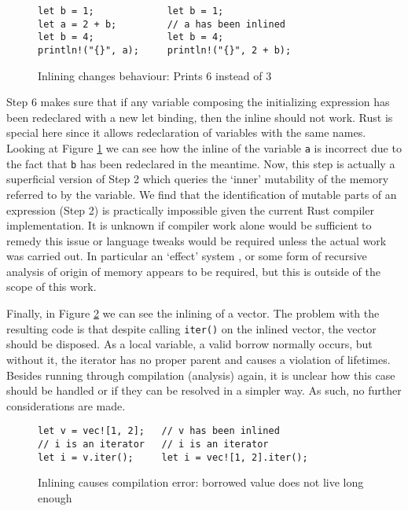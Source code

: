 \begin{figure}[h]
\begin{verbatim}
let b = 1;             let b = 1;
let a = 2 + b;         // a has been inlined
let b = 4;             let b = 4;
println!("{}", a);     println!("{}", 2 + b);
\end{verbatim}
\caption{Inlining changes behaviour: Prints 6 instead of 3}
\label{Fig:newlet}
\end{figure}

Step 6 makes sure that if any variable composing the initializing expression has been redeclared with a new let binding, then the inline should not work. Rust is special here since it allows redeclaration of variables with the same names. Looking at Figure \ref{Fig:newlet} we can see how the inline of the variable {\verb|a|} is incorrect due to the fact that {\verb|b|} has been redeclared in the meantime. Now, this step is actually a superficial version of Step 2 which queries the `inner' mutability of the memory referred to by the variable. We find that the identification of mutable parts of an expression (Step 2) is practically impossible given the current Rust compiler implementation. It is unknown if compiler work alone would be sufficient to remedy this issue or language tweaks would be required unless the actual work was carried out. In particular an `effect' system \cite{effects}, or some form of recursive analysis of origin of memory appears to be required, but this is outside of the scope of this work.

Finally, in Figure \ref{Fig:inlinefail} we can see the inlining of a vector. The problem with the resulting code is that despite calling {\verb|iter()|} on the inlined vector, the vector should be disposed. As a local variable, a valid borrow normally occurs, but without it, the iterator has no proper parent and causes a violation of lifetimes. Besides running through compilation (analysis) again, it is unclear how this case should be handled or if they can be resolved in a simpler way. As such, no further considerations are made.

\begin{figure}[h]
\begin{verbatim}
let v = vec![1, 2];   // v has been inlined
// i is an iterator   // i is an iterator     
let i = v.iter();     let i = vec![1, 2].iter();
\end{verbatim}
\caption{Inlining causes compilation error: borrowed value does not live long enough}
\label{Fig:inlinefail}
\end{figure}

